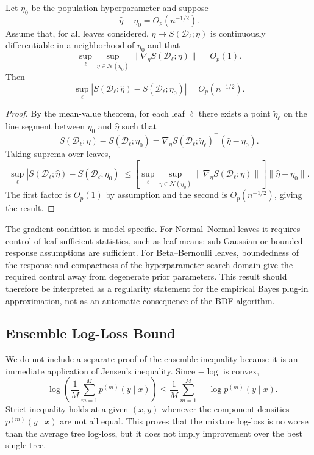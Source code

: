 \begin{lemma}
\label{lem:eb_perturbation}
Let $\eta_0$ be the population hyperparameter and suppose
\[
\hat{\eta}-\eta_0=O_p(n^{-1/2}).
\]
Assume that, for all leaves considered,
$\eta\mapsto S(\mathcal{D}_\ell;\eta)$ is continuously differentiable in a neighborhood of $\eta_0$ and that
\[
\sup_{\ell}
\sup_{\eta\in\mathcal{N}(\eta_0)}
\|
\nabla_\eta S(\mathcal{D}_\ell;\eta)
\|
=
O_p(1).
\]
Then
\[
\sup_\ell
\left|
S(\mathcal{D}_\ell;\hat{\eta})
-
S(\mathcal{D}_\ell;\eta_0)
\right|
=
O_p(n^{-1/2}).
\]
\end{lemma}

\begin{proof}
By the mean-value theorem, for each leaf $\ell$ there exists a point
$\tilde{\eta}_\ell$ on the line segment between $\eta_0$ and $\hat{\eta}$ such that
\[
S(\mathcal{D}_\ell;\hat{\eta})
-
S(\mathcal{D}_\ell;\eta_0)
=
\nabla_\eta S(\mathcal{D}_\ell;\tilde{\eta}_\ell)^\top
(\hat{\eta}-\eta_0).
\]
Taking suprema over leaves,
\[
\sup_\ell
\left|
S(\mathcal{D}_\ell;\hat{\eta})
-
S(\mathcal{D}_\ell;\eta_0)
\right|
\le
\left[
\sup_\ell
\sup_{\eta\in\mathcal{N}(\eta_0)}
\|
\nabla_\eta S(\mathcal{D}_\ell;\eta)
\|
\right]
\|\hat{\eta}-\eta_0\|.
\]
The first factor is $O_p(1)$ by assumption and the second is
$O_p(n^{-1/2})$, giving the result.
\end{proof}

\begin{remark}
The gradient condition is model-specific. For Normal--Normal leaves it requires control of leaf sufficient statistics, such as leaf means; sub-Gaussian or bounded-response assumptions are sufficient. For Beta--Bernoulli leaves, boundedness of the response and compactness of the hyperparameter search domain give the required control away from degenerate prior parameters. This result should therefore be interpreted as a regularity statement for the empirical Bayes plug-in approximation, not as an automatic consequence of the BDF algorithm.
\end{remark}


\subsection{Ensemble Log-Loss Bound}
\label{app:ensemble_bound}

We do not include a separate proof of the ensemble inequality because it is an immediate application of Jensen's inequality. Since $-\log$ is convex,
\[
-\log\left(\frac{1}{M}\sum_{m=1}^M p^{(m)}(y\mid x)\right)
\le
\frac{1}{M}\sum_{m=1}^M
-\log p^{(m)}(y\mid x).
\]
Strict inequality holds at a given $(x,y)$ whenever the component densities
$p^{(m)}(y\mid x)$ are not all equal. This proves that the mixture log-loss is no worse than the average tree log-loss, but it does not imply improvement over the best single tree.
